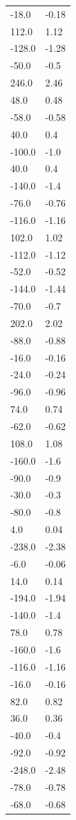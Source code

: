 \begin{longtable}{ll}
-18.0 & -0.18 \\
112.0 & 1.12 \\
-128.0 & -1.28 \\
-50.0 & -0.5 \\
246.0 & 2.46 \\
48.0 & 0.48 \\
-58.0 & -0.58 \\
40.0 & 0.4 \\
-100.0 & -1.0 \\
40.0 & 0.4 \\
-140.0 & -1.4 \\
-76.0 & -0.76 \\
-116.0 & -1.16 \\
102.0 & 1.02 \\
-112.0 & -1.12 \\
-52.0 & -0.52 \\
-144.0 & -1.44 \\
-70.0 & -0.7 \\
202.0 & 2.02 \\
-88.0 & -0.88 \\
-16.0 & -0.16 \\
-24.0 & -0.24 \\
-96.0 & -0.96 \\
74.0 & 0.74 \\
-62.0 & -0.62 \\
108.0 & 1.08 \\
-160.0 & -1.6 \\
-90.0 & -0.9 \\
-30.0 & -0.3 \\
-80.0 & -0.8 \\
4.0 & 0.04 \\
-238.0 & -2.38 \\
-6.0 & -0.06 \\
14.0 & 0.14 \\
-194.0 & -1.94 \\
-140.0 & -1.4 \\
78.0 & 0.78 \\
-160.0 & -1.6 \\
-116.0 & -1.16 \\
-16.0 & -0.16 \\
82.0 & 0.82 \\
36.0 & 0.36 \\
-40.0 & -0.4 \\
-92.0 & -0.92 \\
-248.0 & -2.48 \\
-78.0 & -0.78 \\
-68.0 & -0.68 \\

\end{longtable}
